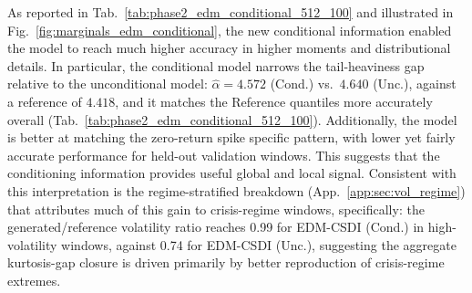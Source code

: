 As reported in Tab.\ \ref{tab:phase2_edm_conditional_512_100} and illustrated in Fig.\ \ref{fig:marginals_edm_conditional}, the new conditional information enabled the model to reach much higher accuracy in higher moments and distributional details. In particular, the conditional model narrows the tail-heaviness gap relative to the unconditional model: \(\hat{\alpha}=4.572\) (Cond.) vs.\ \(4.640\) (Unc.), against a reference of \(4.418\), and it matches the Reference quantiles more accurately overall (Tab.\ \ref{tab:phase2_edm_conditional_512_100}). Additionally, the model is better at matching the zero-return spike specific pattern, with lower yet fairly accurate performance for held-out validation windows. This suggests that the conditioning information provides useful global and local signal. Consistent with this interpretation is the regime-stratified breakdown (App.\ \ref{app:sec:vol_regime}) that attributes much of this gain to crisis-regime windows, specifically: the generated/reference volatility ratio reaches 0.99 for EDM-CSDI (Cond.) in high-volatility windows, against 0.74 for EDM-CSDI (Unc.), suggesting the aggregate kurtosis-gap closure is driven primarily by better reproduction of crisis-regime extremes.

